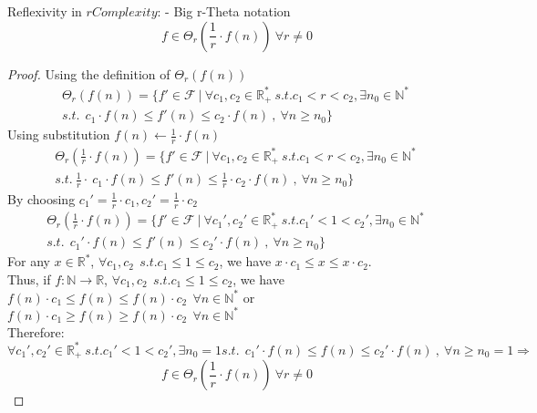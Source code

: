 \begin{theorem}  Reflexivity in $rComplexity$: - Big r-Theta notation  \[ f \in \Theta_{r} \left( \frac{1}{r} \cdot f(n) \right)\ \forall r \neq 0 \]
\end{theorem} 
\begin{proof}
    Using the definition of $ \Theta_{r}(f(n))$
    \[\begin{split} \Theta_{r}(f(n)) = \lbrace f' \in \mathcal{F}\ |\ \forall c_{1}, c_{2} \in \mathbb{R}^{*}_{+} \ s.t.  c_{1}< r < c_{2} , \exists n_{0} \in \mathbb{N}^{*}\ \\ s.t.\ \ c_{1} \cdot f(n) \leq f'(n) \leq c_{2} \cdot f(n)\ ,\  \forall n \geq n_{0} \rbrace \end{split} \]
    Using substitution $ f(n) \longleftarrow \frac{1}{r} \cdot f(n)$
    \[\begin{split} \Theta_{r} \left( \frac{1}{r} \cdot f(n) \right) = \lbrace f' \in \mathcal{F}\ |\ \forall c_{1}, c_{2} \in \mathbb{R}^{*}_{+} \ s.t.  c_{1}< r < c_{2} , \exists n_{0} \in \mathbb{N}^{*}\ \\ s.t.\ \frac{1}{r} \cdot \ c_{1} \cdot f(n) \leq  f'(n) \leq \frac{1}{r} \cdot c_{2} \cdot f(n)\ ,\  \forall n \geq n_{0} \rbrace \end{split} \]
    By choosing $c_{1}' = \frac{1}{r} \cdot c_{1}, c_{2}' = \frac{1}{r} \cdot c_{2}$
   \[\begin{split} \Theta_{r} \left( \frac{1}{r} \cdot f(n) \right) = \lbrace f' \in \mathcal{F}\ |\ \forall c_{1}', c_{2}' \in \mathbb{R}^{*}_{+} \ s.t.  c_{1}'< 1 < c_{2}' , \exists n_{0} \in \mathbb{N}^{*}\ \\ s.t.\  \ c_{1}' \cdot f(n) \leq  f'(n) \leq c_{2}' \cdot f(n)\ ,\  \forall n \geq n_{0} \rbrace \end{split} \]
	For any $x \in \mathbb{R}^{*}$,  $\forall c_{1}, c_{2}\ \ s.t.  c_{1} \leq 1 \leq c_{2}$, we have $ x \cdot c_{1} \leq x \leq x \cdot c_{2} $. \\
   	Thus, if $f:\mathbb{N}\longrightarrow\mathbb{R}$, $\forall c_{1}, c_{2}\ \  s.t.  c_{1} \leq 1 \leq c_{2}$, we have $f(n) \cdot c_{1} \leq f(n) \leq f(n) \cdot c_{2}\ \ \forall n \in \mathbb{N}^{*}$ or $f(n) \cdot c_{1} \geq f(n) \geq f(n) \cdot c_{2}\ \ \forall n \in \mathbb{N}^{*}$\\
   	Therefore:
   	\[\forall c_{1}', c_{2}' \in \mathbb{R}^{*}_{+} \ s.t.  c_{1}'< 1 < c_{2}' , \exists n_{0} = 1  s.t.\  \ c_{1}' \cdot f(n) \leq  f(n) \leq c_{2}' \cdot f(n)\ ,\  \forall n \geq n_{0}=1 \Rightarrow \]
   	\[ f \in \Theta_{r} \left( \frac{1}{r} \cdot f(n) \right)\ \forall r \neq 0 \]
\end{proof}
 
